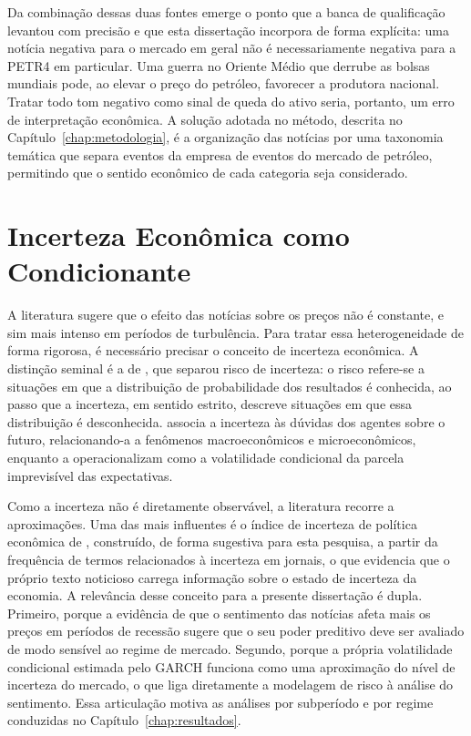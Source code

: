 Da combinação dessas duas fontes emerge o ponto que a banca de qualificação levantou com precisão e que esta dissertação incorpora de forma explícita: uma notícia negativa para o mercado em geral não é necessariamente negativa para a PETR4 em particular. Uma guerra no Oriente Médio que derrube as bolsas mundiais pode, ao elevar o preço do petróleo, favorecer a produtora nacional. Tratar todo tom negativo como sinal de queda do ativo seria, portanto, um erro de interpretação econômica. A solução adotada no método, descrita no Capítulo~\ref{chap:metodologia}, é a organização das notícias por uma taxonomia temática que separa eventos da empresa de eventos do mercado de petróleo, permitindo que o sentido econômico de cada categoria seja considerado.

\section{Incerteza Econômica como Condicionante}

A literatura sugere que o efeito das notícias sobre os preços não é constante, e sim mais intenso em períodos de turbulência. Para tratar essa heterogeneidade de forma rigorosa, é necessário precisar o conceito de incerteza econômica. A distinção seminal é a de , que separou risco de incerteza: o risco refere-se a situações em que a distribuição de probabilidade dos resultados é conhecida, ao passo que a incerteza, em sentido estrito, descreve situações em que essa distribuição é desconhecida.  associa a incerteza às dúvidas dos agentes sobre o futuro, relacionando-a a fenômenos macroeconômicos e microeconômicos, enquanto  a operacionalizam como a volatilidade condicional da parcela imprevisível das expectativas.

Como a incerteza não é diretamente observável, a literatura recorre a aproximações. Uma das mais influentes é o índice de incerteza de política econômica de , construído, de forma sugestiva para esta pesquisa, a partir da frequência de termos relacionados à incerteza em jornais, o que evidencia que o próprio texto noticioso carrega informação sobre o estado de incerteza da economia. A relevância desse conceito para a presente dissertação é dupla. Primeiro, porque a evidência de que o sentimento das notícias afeta mais os preços em períodos de recessão \cite{garcia_sentiment_2013} sugere que o seu poder preditivo deve ser avaliado de modo sensível ao regime de mercado. Segundo, porque a própria volatilidade condicional estimada pelo GARCH funciona como uma aproximação do nível de incerteza do mercado, o que liga diretamente a modelagem de risco à análise do sentimento. Essa articulação motiva as análises por subperíodo e por regime conduzidas no Capítulo~\ref{chap:resultados}.

